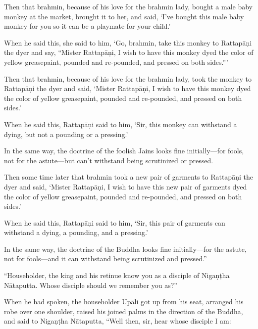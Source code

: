 \documentclass[12pt,openany]{book}%
\begin{document}
Then that brahmin, because of his love for the brahmin lady, bought a male baby monkey at the market, brought it to her, and said, ‘I’ve bought this male baby monkey for you so it can be a playmate for your child.’ 

When he said this, she said to him, ‘Go, brahmin, take this monkey to \textsanskrit{Rattapāṇi} the dyer and say, “Mister \textsanskrit{Rattapāṇi}, I wish to have this monkey dyed the color of yellow greasepaint, pounded and re-pounded, and pressed on both sides.”’ 

Then that brahmin, because of his love for the brahmin lady, took the monkey to \textsanskrit{Rattapāṇi} the dyer and said, ‘Mister \textsanskrit{Rattapāṇi}, I wish to have this monkey dyed the color of yellow greasepaint, pounded and re-pounded, and pressed on both sides.’ 

When he said this, \textsanskrit{Rattapāṇi} said to him, ‘Sir, this monkey can withstand a dying, but not a pounding or a pressing.’ 

In the same way, the doctrine of the foolish Jains looks fine initially—for fools, not for the astute—but can’t withstand being scrutinized or pressed. 

Then some time later that brahmin took a new pair of garments to \textsanskrit{Rattapāṇi} the dyer and said, ‘Mister \textsanskrit{Rattapāṇi}, I wish to have this new pair of garments dyed the color of yellow greasepaint, pounded and re-pounded, and pressed on both sides.’ 

When he said this, \textsanskrit{Rattapāṇi} said to him, ‘Sir, this pair of garments can withstand a dying, a pounding, and a pressing.’ 

In the same way, the doctrine of the Buddha looks fine initially—for the astute, not for fools—and it can withstand being scrutinized and pressed.” 

“Householder, the king and his retinue know you as a disciple of \textsanskrit{Nigaṇṭha} \textsanskrit{Nātaputta}. Whose disciple should we remember you as?” 

When he had spoken, the householder \textsanskrit{Upāli} got up from his seat, arranged his robe over one shoulder, raised his joined palms in the direction of the Buddha, and said to \textsanskrit{Nigaṇṭha} \textsanskrit{Nātaputta}, “Well then, sir, hear whose disciple I am: 
\end{document}
